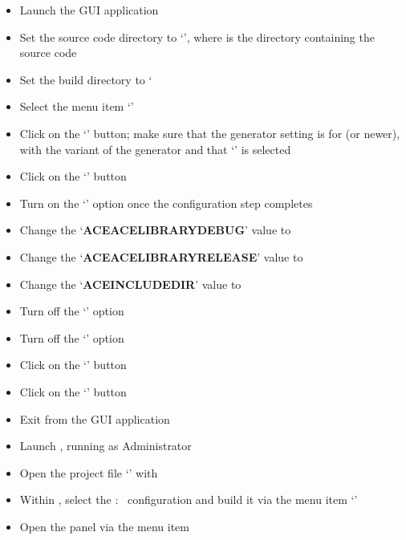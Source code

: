 \begin{itemize}
\item Launch the  GUI application
\item\exSp{}Set the source code directory to `',
where  is the directory containing the \mplusm{} source code
\item\exSp{}Set the build directory to `
\item\exSp{}Select the menu item `'
\item\exSp{}Click on the `' button; make sure that the generator
setting is for  (or newer), with the  variant of
the generator and that `'
is selected
\item\exSp{}Click on the `' button
\item\exSp{}Turn on the `' option once the configuration step completes
\item\exSp{}Change the `\textbf{ACE\fUS{}ACE\fUS{}LIBRARY\fUS{}DEBUG}' value to
\item\exSp{}Change the `\textbf{ACE\fUS{}ACE\fUS{}LIBRARY\fUS{}RELEASE}' value to
\item\exSp{}Change the `\textbf{ACE\fUS{}INCLUDE\fUS{}DIR}' value to
\item\exSp{}Turn off the `' option
\item\exSp{}Turn off the `' option
\item\exSp{}Click on the `' button
\item\exSp{}Click on the `' button
\item\exSp{}Exit from the  GUI application
\item\exSp{}Launch , running as Administrator
\item\exSp{}Open the project file
`' with
\item\exSp{}Within , select the  :\ 
configuration and build it via the menu item
`'
\item\exSp{}Open the  panel via the menu item

\end{itemize}

